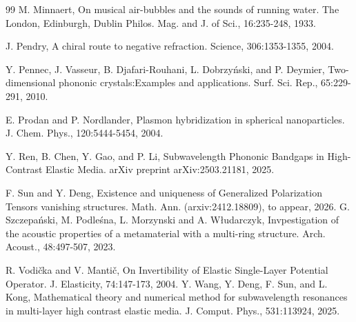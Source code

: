 \documentclass[10pt,reqno,oneside]{amsart}%
\theoremstyle{definition}
\theoremstyle{remark}
\numberwithin{equation}{section}
\numberwithin{equation}{section}
\begin{document}
\begin{thebibliography}{99}
M. Minnaert, On musical air-bubbles and the sounds of running water. The London, Edinburgh, Dublin Philos. Mag. and J. of Sci., 16:235-248, 1933.


J. Pendry, A chiral route to negative refraction. Science, 306:1353-1355, 2004.

Y. Pennec, J. Vasseur, B. Djafari-Rouhani, L. Dobrzy\'nski, and P. Deymier, Two-dimensional phononic crystals:Examples and applications. Surf. Sci. Rep., 65:229-291, 2010.

E. Prodan and P. Nordlander, Plasmon hybridization in spherical nanoparticles. J. Chem. Phys., 120:5444-5454, 2004.


Y. Ren, B. Chen, Y. Gao, and P. Li, Subwavelength Phononic Bandgaps in High-Contrast Elastic Media. arXiv preprint arXiv:2503.21181, 2025.

F. Sun and Y. Deng, Existence and uniqueness of Generalized Polarization Tensors vanishing structures. Math. Ann. (arxiv:2412.18809), to appear, 2026.
G. Szczepa\'nski, M. Podle\'sna, L. Morzynski and A. W{\l}udarczyk, Invpestigation of the acoustic properties of a
metamaterial with a multi-ring structure. Arch. Acoust., 48:497-507, 2023.

R. Vodi\v{c}ka and V. Manti\v{c}, On Invertibility of Elastic Single-Layer Potential Operator. J. Elasticity, 74:147-173, 2004.
Y. Wang, Y. Deng, F. Sun, and L. Kong, Mathematical theory and numerical method for subwavelength resonances in multi-layer high contrast elastic media. J. Comput. Phys., 531:113924, 2025.


\end{thebibliography}
\end{document}
